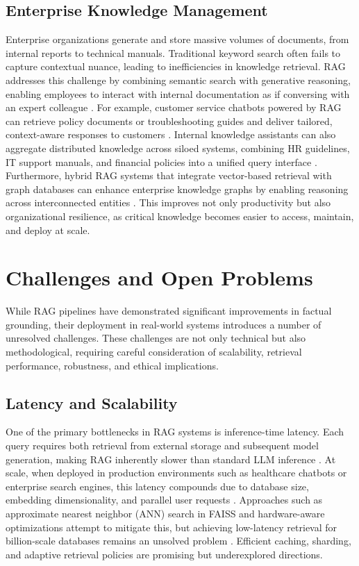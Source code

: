 \documentclass[conference]{IEEEtran}
\begin{document}
\subsection{Enterprise Knowledge Management}
Enterprise organizations generate and store massive volumes of documents, from internal reports to technical manuals. Traditional keyword search often fails to capture contextual nuance, leading to inefficiencies in knowledge retrieval. RAG addresses this challenge by combining semantic search with generative reasoning, enabling employees to interact with internal documentation as if conversing with an expert colleague \cite{johnson2019faiss}. For example, customer service chatbots powered by RAG can retrieve policy documents or troubleshooting guides and deliver tailored, context-aware responses to customers \cite{smith2022enterprise}. Internal knowledge assistants can also aggregate distributed knowledge across siloed systems, combining HR guidelines, IT support manuals, and financial policies into a unified query interface \cite{thakur2021beir}. Furthermore, hybrid RAG systems that integrate vector-based retrieval with graph databases can enhance enterprise knowledge graphs by enabling reasoning across interconnected entities \cite{liu2023hybridrag}. This improves not only productivity but also organizational resilience, as critical knowledge becomes easier to access, maintain, and deploy at scale.
  

\section{Challenges and Open Problems}

While RAG pipelines have demonstrated significant improvements in factual grounding, their deployment in real-world systems introduces a number of unresolved challenges. These challenges are not only technical but also methodological, requiring careful consideration of scalability, retrieval performance, robustness, and ethical implications.

\subsection{Latency and Scalability}
One of the primary bottlenecks in RAG systems is inference-time latency. Each query requires both retrieval from external storage and subsequent model generation, making RAG inherently slower than standard LLM inference \cite{izacard2020leveraging}. At scale, when deployed in production environments such as healthcare chatbots or enterprise search engines, this latency compounds due to database size, embedding dimensionality, and parallel user requests \cite{zhao2023retrievalsurvey}. Approaches such as approximate nearest neighbor (ANN) search in FAISS and hardware-aware optimizations attempt to mitigate this, but achieving low-latency retrieval for billion-scale databases remains an unsolved problem \cite{johnson2019faiss}. Efficient caching, sharding, and adaptive retrieval policies are promising but underexplored directions.
\end{document}
